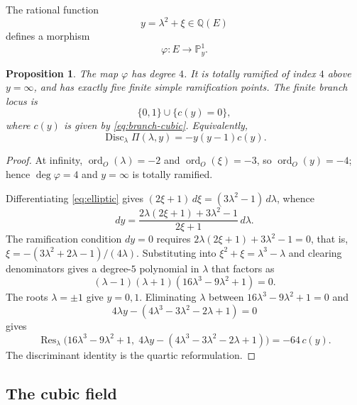\documentclass[11pt,letterpaper]{article}
\theoremstyle{plain}
\newtheorem{proposition}[theorem]{Proposition}
\theoremstyle{remark}
\newcommand{\QQ}{\mathbb{Q}}
\newcommand{\PP}{\mathbb{P}}
\newcommand{\Disc}{\operatorname{Disc}}
\newcommand{\Res}{\operatorname{Res}}
\begin{document}
The rational function
\begin{equation}\label{eq:y-function}
y=\lambda^2+\xi\in \QQ(E)
\end{equation}
defines a morphism
\[
\varphi:E\longrightarrow \PP^1_y.
\]

\begin{proposition}\label{prop:ramification}
The map \(\varphi\) has degree \(4\). It is totally ramified of index \(4\) above \(y=\infty\), and has exactly five finite simple ramification points. The finite branch locus is
\[
\{0,1\}\cup\{c(y)=0\},
\]
where \(c(y)\) is given by \eqref{eq:branch-cubic}. Equivalently,
\[
\Disc_\lambda \Pi(\lambda,y)=-y(y-1)c(y).
\]
\end{proposition}

\begin{proof}
At infinity, \(\operatorname{ord}_O(\lambda)=-2\) and \(\operatorname{ord}_O(\xi)=-3\), so \(\operatorname{ord}_O(y)=-4\); hence \(\deg\varphi=4\) and \(y=\infty\) is totally ramified.

Differentiating \eqref{eq:elliptic} gives \((2\xi+1)\,d\xi=(3\lambda^2-1)\,d\lambda\), whence
\[
dy=\frac{2\lambda(2\xi+1)+3\lambda^2-1}{2\xi+1}\,d\lambda.
\]
The ramification condition \(dy=0\) requires \(2\lambda(2\xi+1)+3\lambda^2-1=0\), that is, \(\xi=-(3\lambda^2+2\lambda-1)/(4\lambda)\). Substituting into \(\xi^2+\xi=\lambda^3-\lambda\) and clearing denominators gives a degree-\(5\) polynomial in \(\lambda\) that factors as
\[
(\lambda-1)(\lambda+1)(16\lambda^3-9\lambda^2+1)=0.
\]
The roots \(\lambda=\pm 1\) give \(y=0,1\). Eliminating \(\lambda\) between \(16\lambda^3-9\lambda^2+1=0\) and
\[
4\lambda y-(4\lambda^3-3\lambda^2-2\lambda+1)=0
\]
gives
\[
\Res_\lambda\!\bigl(16\lambda^3-9\lambda^2+1,\;4\lambda y-(4\lambda^3-3\lambda^2-2\lambda+1)\bigr)=-64\,c(y).
\]
The discriminant identity is the quartic reformulation.
\end{proof}

\subsection{The cubic field}
\end{document}
